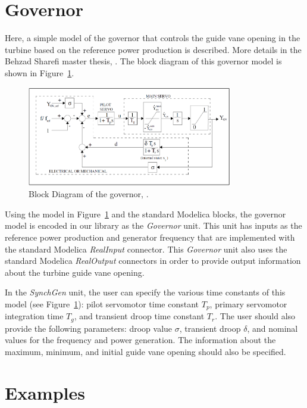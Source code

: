 \documentclass[%
]{USN-PhD}
\begin{document}
\section{Governor}

Here, a simple model of the governor that controls the guide vane opening in the turbine based on the reference power production is described. More details in the Behzad Sharefi master thesis, \cite{Sha:11}. The block diagram of this governor model is shown in Figure~\ref{fig:fig15}.
\begin{figure}
\begin{center}
\includegraphics[width=0.8\textwidth]{fig/Governor} %
\caption{Block Diagram of the governor, \cite{Sha:11}.}
\label{fig:fig15}
\end{center}
\end{figure}

Using the model in Figure~\ref{fig:fig15} and the standard Modelica blocks, the governor model is encoded in our library as the \emph{Governor} unit. This unit has inputs as the reference power production and generator frequency that are implemented with the standard Modelica \emph{RealInput} connector. This \emph{Governor} unit also uses the standard Modelica \emph{RealOutput} connectors in order to provide output information about the turbine guide vane opening.

In the \emph{SynchGen} unit, the user can specify the various time constants of this model (see Figure~\ref{fig:fig15}): pilot servomotor time constant $T_p$, primary servomotor integration time $T_g$, and transient droop time constant $T_r$. The user should also provide the following parameters: droop value $\sigma$, transient droop $\delta$, and nominal values for the frequency and power generation. The information about the maximum, minimum, and initial guide vane opening should also be specified.

\section{Examples}
\end{document}
